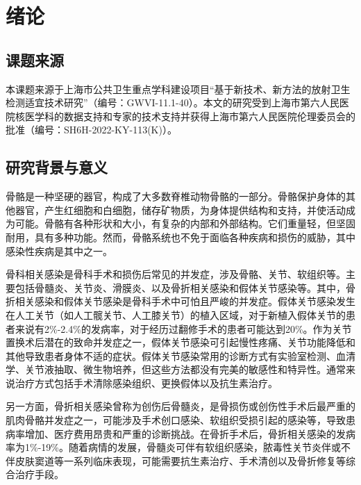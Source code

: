 \chapter{绪论}\label{chap:introduction}

\section{课题来源}

本课题来源于上海市公共卫生重点学科建设项目“基于新技术、新方法的放射卫生检测适宜技术研究”（编号：GWVI-11.1-40）。本文的研究受到上海市第六人民医院核医学科的数据支持和专家的技术支持并获得上海市第六人民医院伦理委员会的批准（编号：SH6H-2022-KY-113(K)）。

\section{研究背景与意义}

骨骼是一种坚硬的器官\cite{morgan2021bone}，构成了大多数脊椎动物骨骼的一部分。骨骼保护身体的其他器官，产生红细胞和白细胞，储存矿物质，为身体提供结构和支持，并使活动成为可能。骨骼有各种形状和大小，有复杂的内部和外部结构\cite{de2021vertebrate}。它们重量轻，但坚固耐用，具有多种功能。然而，骨骼系统也不免于面临各种疾病和损伤的威胁，其中感染性疾病是其中之一。

骨科相关感染是骨科手术和损伤后常见的并发症，涉及骨骼、关节、软组织等。主要包括骨髓炎、关节炎、滑膜炎、以及骨折相关感染和假体关节感染等。其中，骨折相关感染和假体关节感染是骨科手术中可怕且严峻的并发症\cite{sidiropoulos2022viral}。假体关节感染发生在人工关节（如人工髋关节、人工膝关节）的植入区域，对于新植入假体关节的患者来说有2\%-2.4\%的发病率，对于经历过翻修手术的患者可能达到20\%\cite{sconfienza2019diagnosis}。作为关节置换术后潜在的致命并发症之一\cite{niccoli2017bone,usuelli2019infections}，假体关节感染可引起慢性疼痛、关节功能降低和其他导致患者身体不适的症状\cite{aleksyniene2022role}。假体关节感染常用的诊断方式有实验室检测、血清学、关节液抽取、微生物培养，但这些方法都没有完美的敏感性和特异性\cite{meermans2010there,parvizi2012mark,fink2013high,paul20142013,fink2018preoperative,claassen2014preoperative}。通常来说治疗方式包括手术清除感染组织、更换假体以及抗生素治疗。

另一方面，骨折相关感染曾称为创伤后骨髓炎，是骨损伤或创伤性手术后最严重的肌肉骨骼并发症之一\cite{govaert2020diagnosing}，可能涉及手术创口感染、软组织受损引起的感染等，导致患病率增加、医疗费用昂贵和严重的诊断挑战\cite{metsemakers2017infection}。在骨折手术后，骨折相关感染的发病率为1\%-19\%\cite{ktistakis2014infection, malhotra2014open}。随着病情的发展，骨髓炎可伴有软组织感染，脓毒性关节炎伴或不伴皮肤窦道等一系列临床表现\cite{bhoil2019role}，可能需要抗生素治疗、手术清创以及骨折修复等综合治疗手段。

